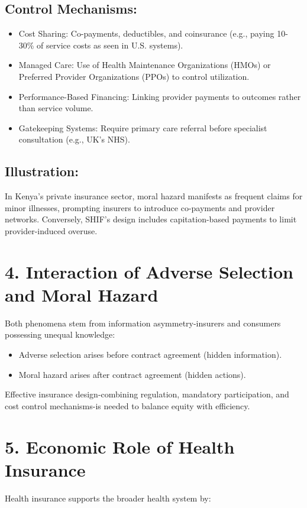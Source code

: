 \documentclass[10pt]{article}
\begin{document}
\subsection*{Control Mechanisms:}
\begin{itemize}
  \item Cost Sharing: Co-payments, deductibles, and coinsurance (e.g., paying 10-30\% of service costs as seen in U.S. systems).
  \item Managed Care: Use of Health Maintenance Organizations (HMOs) or Preferred Provider Organizations (PPOs) to control utilization.
  \item Performance-Based Financing: Linking provider payments to outcomes rather than service volume.
  \item Gatekeeping Systems: Require primary care referral before specialist consultation (e.g., UK's NHS).
\end{itemize}

\subsection*{Illustration:}
In Kenya's private insurance sector, moral hazard manifests as frequent claims for minor illnesses, prompting insurers to introduce co-payments and provider networks. Conversely, SHIF's design includes capitation-based payments to limit provider-induced overuse.

\section*{4. Interaction of Adverse Selection and Moral Hazard}
Both phenomena stem from information asymmetry-insurers and consumers possessing unequal knowledge:

\begin{itemize}
  \item Adverse selection arises before contract agreement (hidden information).
  \item Moral hazard arises after contract agreement (hidden actions).
\end{itemize}

Effective insurance design-combining regulation, mandatory participation, and cost control mechanisms-is needed to balance equity with efficiency.

\section*{5. Economic Role of Health Insurance}
Health insurance supports the broader health system by:
\end{document}
